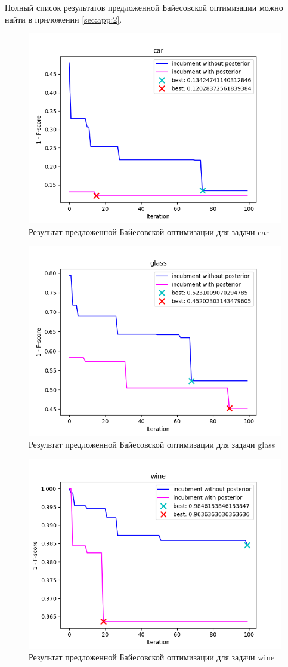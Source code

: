 \documentclass[times,specification,annotation]{itmo-student-thesis}
\begin{document}
Полный список результатов предложенной Байесовской оптимизации можно найти в приложении  \ref{sec:app:2}.
	\begin{figure}[!ht]
	\caption{Результат предложенной Байесовской оптимизации для задачи car}\label{img:bo}
	\includegraphics[width=0.85\linewidth]{p-car}
	\centering
\end{figure}
\begin{figure}[!ht]
	\caption{Результат предложенной Байесовской оптимизации для задачи glass}\label{img:bo}
	\includegraphics[width=0.85\linewidth]{p-glass}
	\centering
\end{figure}
\begin{figure}[!ht]
	\caption{Результат предложенной Байесовской оптимизации для задачи wine}\label{img:bo}
	\includegraphics[width=0.85\linewidth]{p-wine}
	\centering
\end{figure}
\end{document}
